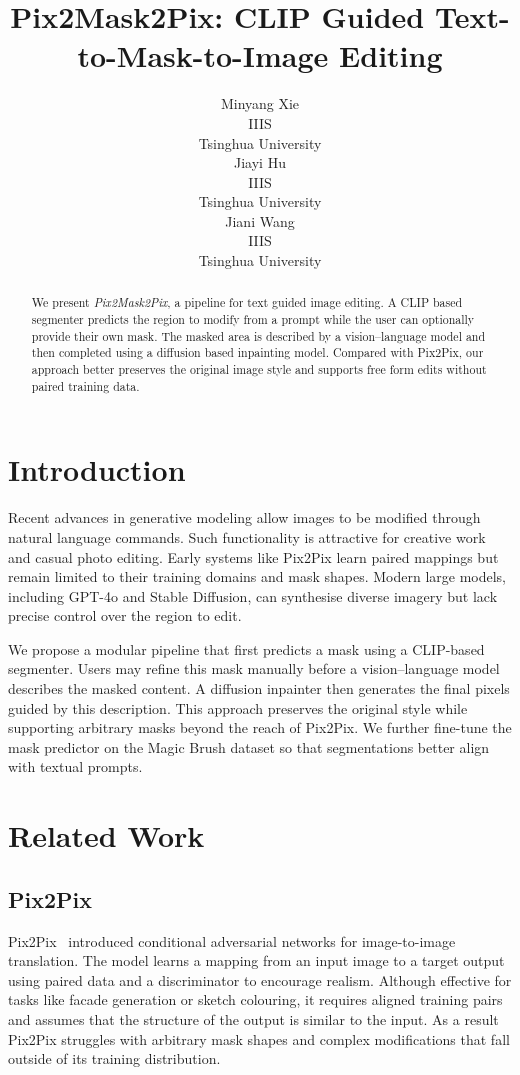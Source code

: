 \documentclass{article}
\title{Pix2Mask2Pix: CLIP Guided Text-to-Mask-to-Image Editing}
\author{%
  Minyang Xie\\
  IIIS\\
  Tsinghua University\\
  \And
  Jiayi Hu \\
  IIIS \\
  Tsinghua University \\
  \And
  Jiani Wang \\
  IIIS \\
  Tsinghua University \\
}
\begin{document}
\maketitle


\begin{abstract}
We present \emph{Pix2Mask2Pix}, a pipeline for text guided image editing. A
CLIP based segmenter predicts the region to modify from a prompt while the user
can optionally provide their own mask. The masked area is described by a
vision--language model and then completed using a diffusion based inpainting
model. Compared with Pix2Pix, our approach better preserves the original image
style and supports free form edits without paired training data.
\end{abstract}


\section{Introduction}


Recent advances in generative modeling allow images to be modified through
natural language commands. Such functionality is attractive for creative work
and casual photo editing. Early systems like Pix2Pix learn paired mappings but
remain limited to their training domains and mask shapes. Modern large models,
including GPT-4o and Stable Diffusion, can synthesise diverse imagery but lack
precise control over the region to edit.

We propose a modular pipeline that first predicts a mask using a CLIP-based
segmenter. Users may refine this mask manually before a vision--language model
describes the masked content. A diffusion inpainter then generates the final
pixels guided by this description. This approach preserves the original style
while supporting arbitrary masks beyond the reach of Pix2Pix. We further
fine-tune the mask predictor on the Magic Brush dataset so that segmentations
better align with textual prompts.


\section{Related Work}


\subsection{Pix2Pix}

Pix2Pix~\cite{isola2017pix2pix} introduced conditional adversarial networks for
image-to-image translation. The model learns a mapping from an input image to a
target output using paired data and a discriminator to encourage realism.
Although effective for tasks like facade generation or sketch colouring, it
requires aligned training pairs and assumes that the structure of the output is
similar to the input. As a result Pix2Pix struggles with arbitrary mask shapes
and complex modifications that fall outside of its training distribution.
\end{document}
